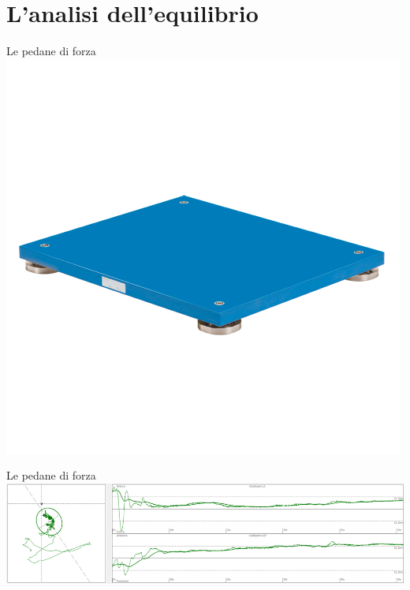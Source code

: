 \documentclass{beamer}
\begin{document}
    \section{L'analisi dell'equilibrio}
    \begin{frame}{Le pedane di forza}
        \centering
        \includegraphics[scale=0.45]{../figures/pedana.png}
    \end{frame}
    \begin{frame}{Le pedane di forza}
        \centering
        \includegraphics[scale=0.3]{../figures/statokinesigramma.jpg}
    \end{frame}
\end{document}
